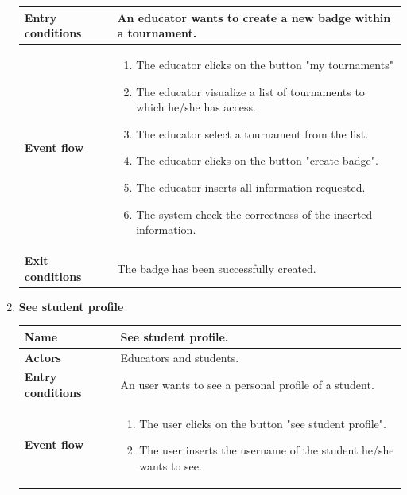 \begin{enumerate}[label=\textbf{UC.\arabic*}]
\begin{table}[H]
\begin{tabular}{|m{3.2cm}|m{9.8cm}|}
                    \hline
                    \textbf{Entry conditions}  & An educator wants to create a new badge within a tournament. \\
                    \hline
                    \textbf{Event flow}  & 
                    \begin{enumerate}[label=\arabic*.]
                        \item The educator clicks on the button "my tournaments"
                        \item The educator visualize a list of tournaments to which he/she has access.
                        \item The educator select a tournament from the list.
                        \item The educator clicks on the button "create badge".
                        \item The educator inserts all information requested.
                        \item The system check the correctness of the inserted information.
                    \end{enumerate}\\ 
                    \hline
                    \textbf{Exit conditions}  & The badge has been successfully created. \\
                    \hline
                \end{tabular}
        \end{table}
        \item {} \textbf{See student profile}
        \begin{table}[H]
    	    \centering
                \renewcommand{\arraystretch}{1.5}
                \begin{tabular}{|m{3.2cm}|m{9.8cm}|}
                    \hline
                    \textbf{Name} & See student profile. \\
                    \hline
                    \textbf{Actors} & Educators and students. \\
                    \hline
                    \textbf{Entry conditions}  & An user wants to see a personal profile of a student. \\
                    \hline
                    \textbf{Event flow}  & 
                    \begin{enumerate}[label=\arabic*.]
                        \item The user clicks on the button "see student profile".
                        \item The user inserts the username of the student he/she wants to see.

\end{enumerate}
\end{tabular}
\end{table}
\end{enumerate}
